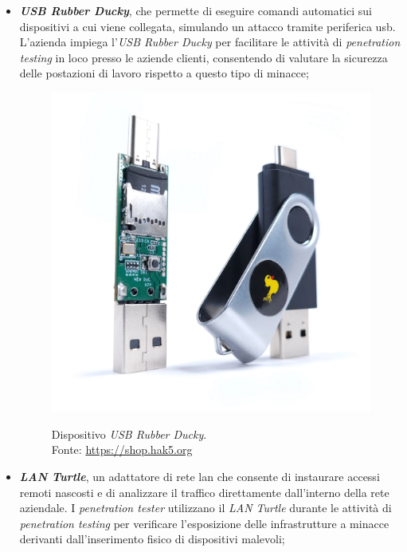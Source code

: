 \begin{itemize}
    \item \textbf{\textit{USB Rubber Ducky}}, che permette di eseguire comandi automatici sui dispositivi a cui viene collegata, simulando un attacco tramite periferica \gls{usb}. L'azienda impiega l'\textit{USB Rubber Ducky} per facilitare le attività di \textit{penetration testing} in loco presso le aziende clienti, consentendo di valutare la sicurezza delle postazioni di lavoro rispetto a questo tipo di minacce;\\
    \begin{figure}[H]
    \centering
    \includegraphics[alt={USB Rubber Ducky}, width=0.8\columnwidth]{img/usb-rubber-ducky_mk2_2000x.jpg}
    \caption{Dispositivo \textit{USB Rubber Ducky}.\\ Fonte: \url{https://shop.hak5.org}}
    \label{fig:usb-rubber-ducky}
    \end{figure}
    \item \textbf{\textit{LAN Turtle}}, un adattatore di rete \gls{lan} che consente di instaurare accessi remoti nascosti e di analizzare il traffico direttamente dall'interno della rete aziendale. I \textit{penetration tester} utilizzano il \textit{LAN Turtle} durante le attività di \textit{penetration testing} per verificare l'esposizione delle infrastrutture a minacce derivanti dall'inserimento fisico di dispositivi malevoli;
    \begin{figure}[H]
    \centering

\end{figure}
\end{itemize}
